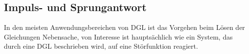 

\subsection{Impuls- und Sprungantwort}
In den meisten Anwendungsbereichen von DGL ist das Vorgehen beim Lösen der
Gleichungen Nebensache, von Interesse ist hauptsächlich wie ein System, das
durch eine DGL beschrieben wird, auf eine Störfunktion reagiert.

